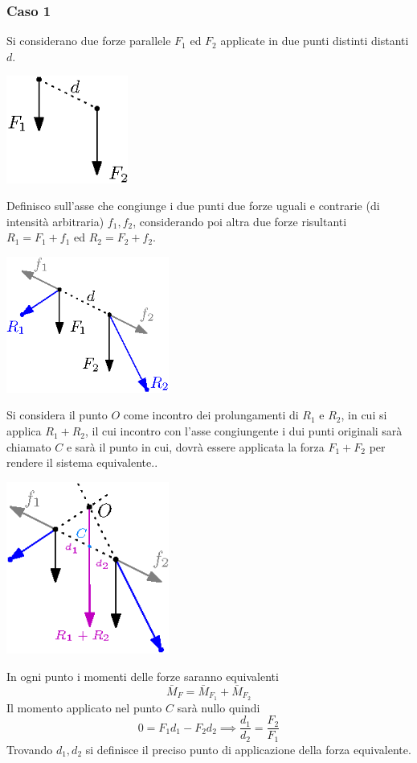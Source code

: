 \documentclass[10pt, letterpaper]{report}
\begin{document}
\subsubsection{Caso 1}
Si considerano due forze parallele $F_1$ ed $F_2$ applicate in due punti distinti distanti $d$.\begin{center}
    \includegraphics[width=0.3\textwidth ]{images/forzeEq1.eps}
\end{center}
Definisco sull'asse che congiunge i due punti due forze uguali e contrarie (di intensità arbitraria) $f_1,f_2$, 
considerando poi altra due forze risultanti $R_1=F_1+f_1$ ed $R_2=F_2+f_2$.
\begin{center}
    \includegraphics[width=0.4\textwidth ]{images/forzeEq2.eps}
\end{center}
Si considera il punto $O$ come incontro dei prolungamenti di $R_1$ e $R_2$, in cui si applica $R_1+R_2$, il cui incontro con l'asse congiungente i dui punti originali sarà chiamato $C$ e sarà il punto in cui, dovrà essere applicata la forza $F_1+F_2$ per rendere il sistema equivalente..
\begin{center}
    \includegraphics[width=0.4\textwidth ]{images/forzeEq3.eps}
\end{center}
In ogni punto i momenti delle forze saranno equivalenti 
$$ \bar M_F=\bar M_{F_1}+\bar M_{F_2}$$
Il momento applicato nel punto $C$ sarà nullo quindi 
$$ 0=F_1d_1-F_2d_2\implies \frac{d_1}{d_2}=\frac{F_2}{F_1}$$
Trovando $d_1,d_2$ si definisce il preciso punto di applicazione della forza equivalente.
\end{document}
